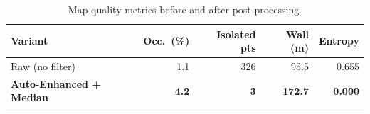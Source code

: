\begin{table}[htbp]
    \centering
    \caption{Map quality metrics before and after post-processing.}
    \label{tab:map_enhancement}
    \begin{tabular}{lrrrr}
        \toprule
        Variant & Occ.\ (\%) & Isolated pts & Wall (m) & Entropy \\
        \midrule
        Raw (no filter) & 1.1 & 326 & 95.5 & 0.655 \\
        \textbf{Auto-Enhanced + Median} & \textbf{4.2} & \textbf{3} & \textbf{172.7} & \textbf{0.000} \\
        \bottomrule
    \end{tabular}
\end{table}

